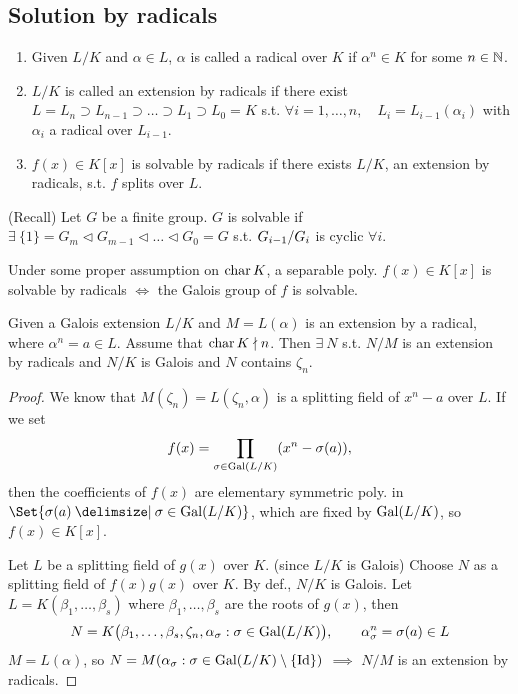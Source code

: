 \subsection{Solution by radicals}

\begin{definition} \mbox{}
  \begin{enumerate}
    \item Given $L/K$ and $\alpha \in L$, $\alpha$ is called a radical over $K$
      if $\alpha^n \in K$ for some $n\in \mathbb{N}$.
    \item $L/K$ is called an extension by radicals if there exist
      $L = L_n \supset L_{n-1} \supset \dots \supset L_1 \supset L_0 = K$
      s.t. $\forall i = 1,\dots, n, \quad L_i = L_{i-1}(\alpha_i)$ with
      $\alpha_i$ a radical over $L_{i-1}$.
    \item $f(x) \in K[x]$ is solvable by radicals if there exists $L/K$,
      an extension by radicals, s.t. $f$ splits over $L$.
  \end{enumerate}
\end{definition}

\begin{definition}
  (Recall) Let $G$ be a finite group. $G$ is solvable if
  $\exists\: \{1\} = G_m \lhd G_{m-1} \lhd \dots \lhd G_0 = G$ s.t.
  ${G_{i-1}}/{G_i}$ is cyclic $\forall i$.
\end{definition}

\begin{theorem}
  Under some proper assumption on $\operatorname{char} K$, a separable poly. $f(x) \in K[x]$
  is solvable by radicals $\iff$ the Galois group of $f$ is solvable.
\end{theorem}

\begin{lemma} \label{lemma:galois-radical-ext}
  Given a Galois extension $L/K$ and $M = L(\alpha)$ is an extension by
  a radical, where $\alpha^n = a \in L$. Assume that $\operatorname{char} K \nmid n$. Then
  $\exists\: N$ s.t. $N/M$ is an extension by radicals and $N/K$ is Galois
  and $N$ contains $\zeta_n$.
  \begin{proof}
    We know that $M(\zeta_n) = L(\zeta_n, \alpha)$ is a splitting field of
    $x^n - a$ over $L$. If we set
    \[ f(x) = \prod_{\sigma \in \operatorname{Gal}(L/K)} (x^n - \sigma(a)), \]
    then the coefficients of $f(x)$ are elementary symmetric poly. in
    $\Set{\sigma(a) \given \sigma \in \Gal(L/K) }$, which are fixed by
    $\operatorname{Gal}(L/K)$, so $f(x) \in K[x]$.

    Let $L$ be a splitting field of $g(x)$ over $K$. (since $L/K$ is Galois)
    Choose $N$ as a splitting field of $f(x)g(x)$ over $K$.
    By def., $N/K$ is Galois. Let $L = K(\beta_1,\dots,\beta_s)$ where
    $\beta_1, \dots, \beta_s$ are the roots of $g(x)$, then
    \[
      N = K\big(\beta_1,\dots,\beta_s, \zeta_n,
        \alpha_\sigma : \sigma \in \operatorname{Gal}(L/K)
      \big),
      \qquad \alpha_\sigma^n = \sigma(a) \in L
    \]
    $M = L(\alpha)$,
    so $N = M(\alpha_\sigma : \sigma \in \operatorname{Gal}(L/K) \setminus \{ {\rm Id} \})$
    $\implies$ $N/M$ is an extension by radicals.
  \end{proof}
\end{lemma}

